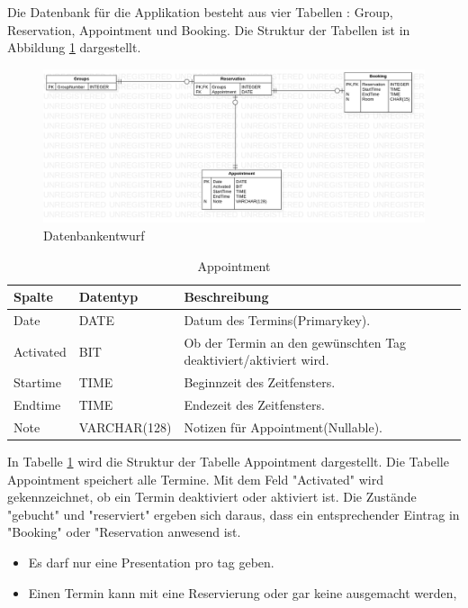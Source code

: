 \documentclass[10pt,a4paper]{article}
\begin{document}
Die Datenbank für die Applikation besteht aus vier Tabellen : Group, Reservation, Appointment und Booking.
Die Struktur der Tabellen ist in Abbildung \ref{fig:ER-Diagramm} dargestellt.

\begin{figure}[ht]
	\label{fig:ER-Diagramm}	
	\centering
	\includegraphics[scale=0.3]{ER-Diagramm}
	\caption{Datenbankentwurf}	
	\end{figure}

\begin{table}[h]
\centering
\caption{Appointment}
	\label{tab:Appointment}   
    \begin{tabular}{| l | l | l | l |}
    \hline
    \rowcolor{lightgray} Spalte & Datentyp & Beschreibung  \\ \hline
    Date  & DATE & Datum des Termins(Primarykey).\\ \hline
    Activated & BIT & Ob der Termin an den gewünschten Tag deaktiviert/aktiviert wird.\\ \hline
    Startime & TIME & Beginnzeit des Zeitfensters. \\ \hline
    Endtime & TIME & Endezeit des Zeitfensters.  \\ \hline
    Note & VARCHAR(128) & Notizen für Appointment(Nullable). \\ \hline
    \end{tabular}
\end{table}


In Tabelle \ref{tab:Appointment} wird die Struktur der Tabelle Appointment dargestellt. Die Tabelle Appointment speichert alle Termine. Mit dem Feld "Activated" wird gekennzeichnet, ob ein Termin deaktiviert oder aktiviert ist. Die Zustände "gebucht" und "reserviert" ergeben sich daraus, dass ein entsprechender Eintrag in "Booking" oder "Reservation anwesend ist.
\begin{itemize}
\item Es darf nur eine Presentation pro tag geben.
\item Einen Termin kann mit eine Reservierung oder gar keine ausgemacht werden, 
\end{itemize}
\end{document}
